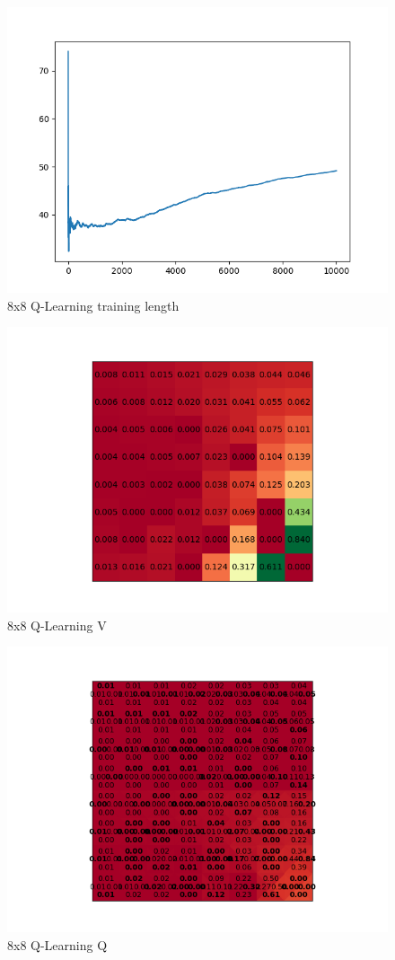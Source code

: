 \documentclass[a4paper]{article}
\begin{document}
\begin{figure}[!ht]
	\centering
	\includegraphics[width=0.8\linewidth]{8x8_qlearn_length}
	\caption{8x8 Q-Learning training length}
	\label{fig:8x8_qlearnlength}
\end{figure}
\begin{figure}[!ht]
	\centering
	\includegraphics[width=0.6\linewidth]{8x8_qlearn_v}
	\caption{8x8 Q-Learning V}
	\label{fig:8x8_qlearnreward}
\end{figure}
\begin{figure}[!ht]
	\centering
	\includegraphics[width=0.6\linewidth]{8x8_qlearn_q}
	\caption{8x8 Q-Learning Q}
	\label{fig:8x8_qlearnpolicy}
\end{figure}
\end{document}

